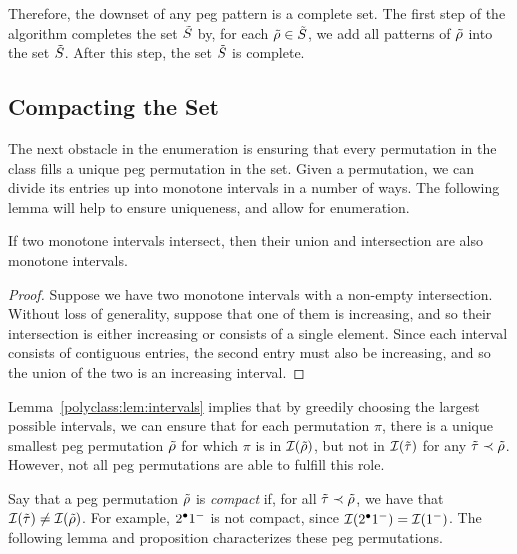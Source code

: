     Therefore, the downset of any peg pattern is a complete set.  The first
    step of the algorithm completes the set $\tilde{S}$ by, 
    for each $\tilde{\rho} \in \tilde{S}$, we add all patterns of $\tilde{\rho}$ into the set $\tilde{S}$.
    After this step, the set $\tilde{S}$ is complete. 

  \subsection{Compacting the Set}


    The next obstacle in the enumeration is ensuring that every permutation in
    the class fills a unique peg permutation in the set.  Given a permutation,
    we can divide its entries up into monotone intervals in a number of ways.
    The following lemma will help to ensure uniqueness, and allow for
    enumeration. 

    \begin{lemma} \label{polyclass:lem:intervals}
      If two monotone intervals intersect, then their union and intersection
      are also monotone intervals.
    \end{lemma}
    \begin{proof}
      Suppose we have two monotone intervals with a non-empty intersection.
      Without loss of generality, suppose that one of them is increasing, and
      so their intersection is either increasing or consists of a single
      element. Since each interval consists of contiguous entries, the second
      entry must also be increasing, and so the union of the two is an
      increasing interval. 
    \end{proof}
    
    Lemma~\ref{polyclass:lem:intervals} implies that by greedily choosing the
    largest possible intervals, we can ensure that for each permutation $\pi$,
    there is a unique smallest peg permutation $\tilde{\rho}$ for which $\pi$ is in
    $\mathcal{I}(\tilde{\rho})$, but not in $\mathcal{I}(\tilde{\tau})$ for any $\tilde{\tau} \prec \tilde{\rho}$. However, not
    all peg permutations are able to fulfill this role. 

    Say that a peg permutation $\tilde{\rho}$ is \emph{compact} if, for all $\tilde{\tau} \prec
    \tilde{\rho}$, we have that $\mathcal{I}(\tilde{\tau}) \not = \mathcal{I}(\tilde{\rho})$. For example, $2^\bullet 1^-$
    is not compact, since $\mathcal{I}(2^\bullet 1^-) = \mathcal{I}(1^-)$. The following
    lemma and proposition characterizes these peg permutations. 



